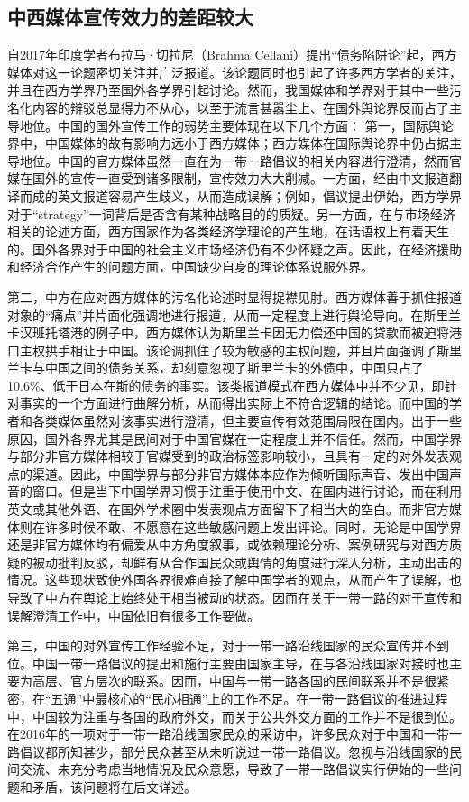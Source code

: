 \documentclass[a4paper,UTF8]{article}
\begin{document}
		\subsection{中西媒体宣传效力的差距较大}
			自2017年印度学者布拉马·切拉尼（Brahma Cellani）提出“债务陷阱论”起，西方媒体对这一论题密切关注并广泛报道。该论题同时也引起了许多西方学者的关注，并且在西方学界乃至国外各学界引起讨论。然而，我国媒体和学界对于其中一些污名化内容的辩驳总显得力不从心，以至于流言甚嚣尘上、在国外舆论界反而占了主导地位。中国的国外宣传工作的弱势主要体现在以下几个方面：
			第一，国际舆论界中，中国媒体的故有影响力远小于西方媒体；西方媒体在国际舆论界中仍占据主导地位。中国的官方媒体虽然一直在为一带一路倡议的相关内容进行澄清，然而官媒在国外的宣传一直受到诸多限制，宣传效力大大削减。一方面，经由中文报道翻译而成的英文报道容易产生歧义，从而造成误解；例如，倡议提出伊始，西方学界对于“strategy”一词背后是否含有某种战略目的的质疑。另一方面，在与市场经济相关的论述方面，西方国家作为各类经济学理论的产生地，在话语权上有着天生的。国外各界对于中国的社会主义市场经济仍有不少怀疑之声。因此，在经济援助和经济合作产生的问题方面，中国缺少自身的理论体系说服外界。
			
			第二，中方在应对西方媒体的污名化论述时显得捉襟见肘。西方媒体善于抓住报道对象的“痛点”并片面化强调地进行报道，从而一定程度上进行舆论导向。在斯里兰卡汉班托塔港的例子中，西方媒体认为斯里兰卡因无力偿还中国的贷款而被迫将港口主权拱手相让于中国。该论调抓住了较为敏感的主权问题，并且片面强调了斯里兰卡与中国之间的债务关系，却刻意忽视了斯里兰卡的外债中，中国只占了10.6\%、低于日本在斯的债务的事实。该类报道模式在西方媒体中并不少见，即针对事实的一个方面进行曲解分析，从而得出实际上不符合逻辑的结论。而中国的学者和各类媒体虽然对该事实进行澄清，但主要宣传有效范围局限在国内。出于一些原因，国外各界尤其是民间对于中国官媒在一定程度上并不信任。然而，中国学界与部分非官方媒体相较于官媒受到的政治标签影响较小，且具有一定的对外发表观点的渠道。因此，中国学界与部分非官方媒体本应作为倾听国际声音、发出中国声音的窗口。但是当下中国学界习惯于注重于使用中文、在国内进行讨论，而在利用英文或其他外语、在国外学术圈中发表观点方面留下了相当大的空白。而非官方媒体则在许多时候不敢、不愿意在这些敏感问题上发出评论。同时，无论是中国学界还是非官方媒体均有偏爱从中方角度叙事，或依赖理论分析、案例研究与对西方质疑的被动批判反驳，却鲜有从合作国民众或舆情的角度进行深入分析，主动出击的情况。这些现状致使外国各界很难直接了解中国学者的观点，从而产生了误解，也导致了中方在舆论上始终处于相当被动的状态。因而在关于一带一路的对于宣传和误解澄清工作中，中国依旧有很多工作要做。
			
			第三，中国的对外宣传工作经验不足，对于一带一路沿线国家的民众宣传并不到位。中国一带一路倡议的提出和施行主要由国家主导，在与各沿线国家对接时也主要为高层、官方层次的联系。因而，中国与一带一路各国的民间联系并不是很紧密，在“五通”中最核心的“民心相通”上的工作不足。在一带一路倡议的推进过程中，中国较为注重与各国的政府外交，而关于公共外交方面的工作并不是很到位。在2016年的一项对于一带一路沿线国家民众的采访中，许多民众对于中国和一带一路倡议都所知甚少，部分民众甚至从未听说过一带一路倡议。忽视与沿线国家的民间交流、未充分考虑当地情况及民众意愿，导致了一带一路倡议实行伊始的一些问题和矛盾，该问题将在后文详述。
			
\end{document}
